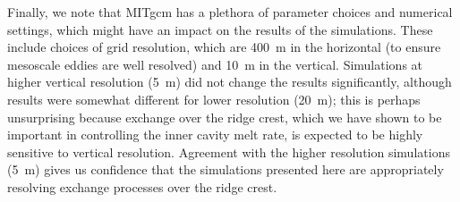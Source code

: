 \documentclass[draft]{agujournal2019}
\begin{document}
Finally, we note that MITgcm has a plethora of parameter choices and numerical settings, which might have an impact on the results of the simulations. These include choices of grid resolution, which are 400~m in the horizontal (to ensure mesoscale eddies are well resolved) and 10~m in the vertical. Simulations at higher vertical resolution (5~m) did not change the results significantly, although results were somewhat different for lower resolution (20~m); this is perhaps unsurprising because exchange over the ridge crest, which we have shown to be important in controlling the inner cavity melt rate, is expected to be highly sensitive to vertical resolution. Agreement with the higher resolution simulations (5~m) gives us confidence that the simulations presented here are appropriately resolving exchange processes over the ridge crest. 
\end{document}
